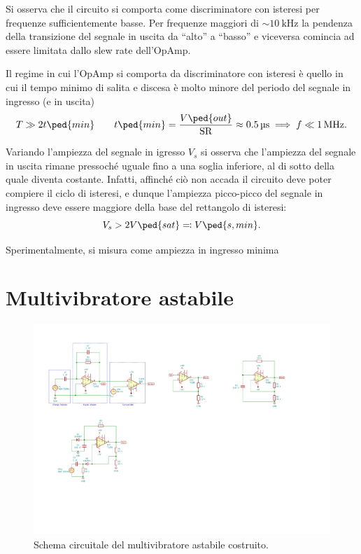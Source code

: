 \documentclass[10pt,a4paper]{article}
\begin{document}
Si osserva che il circuito si comporta come discriminatore con isteresi per
frequenze sufficientemente basse. Per frequenze maggiori di
$\sim\SI{10}{\kilo\hertz}$ la pendenza della transizione del segnale in
uscita da ``alto'' a ``basso'' e viceversa comincia ad essere limitata dallo
slew rate dell'OpAmp.

Il regime in cui l'OpAmp si comporta da discriminatore con isteresi è quello
in cui il tempo minimo di salita e discesa è molto minore del periodo del
segnale in ingresso (e in uscita)
\begin{equation}\label{eq:slewlimit}
T \gg 2 t \ped{min} \qquad t \ped{min} = \frac{V\ped{out}}{\mathrm{SR}} \approx \SI{0.5}{\micro\second} \implies f \ll \SI{1}{M\hertz}.
  \end{equation}

Variando l'ampiezza del segnale in igresso $V_s$ si osserva che l'ampiezza del
segnale in uscita rimane pressoché uguale fino a una soglia inferiore, al di
sotto della quale diventa costante. 
Infatti, affinché ciò non accada il circuito deve poter compiere il ciclo di
isteresi, e dunque l'ampiezza picco-picco del segnale in ingresso deve essere
maggiore della base del rettangolo di isteresi:
\[ V_s > 2 V \ped{sat} \eqqcolon V\ped{s, min}. \]

Sperimentalmente, si misura come ampiezza in ingresso minima

\section{Multivibratore astabile}

\begin{figure}[htbp]
    \centering
	\includegraphics[scale=1.5]{astable}
    \caption{Schema circuitale del multivibratore astabile costruito.
    \label{fig: astableschm}}
\end{figure}
\end{document}

